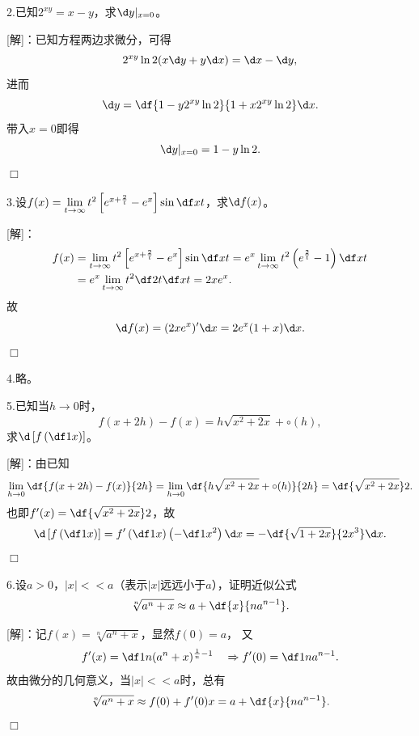 \bigskip

2.已知$2^{xy}=x-y$，求$\d y|_{x=0}$。

[解]：已知方程两边求微分，可得
$$2^{xy}\ln2(x\d y+y\d x)=\d x-\d y,$$
进而
$$\d y=\df{1-y2^{xy}\ln2}{1+x2^{xy}\ln2}\d x.$$
带入$x=0$即得
$$\d y|_{x=0}=1-y\ln2.$$
\hfill$\Box$

\bigskip

3.设$f(x)=\lim\limits_{t\to\infty}t^2
\left[e^{x+\frac2t}-e^x\right]\sin\df xt$，求$\d f(x)$。

[解]：
\begin{align*}
	f(x)&=\lim\limits_{t\to\infty}t^2
	\left[e^{x+\frac2t}-e^x\right]\sin\df xt
	=e^x\lim\limits_{t\to\infty}t^2
	\left(e^{\frac2t}-1\right)\df xt\\
	&=e^x\lim\limits_{t\to\infty}t^2\df2t\df xt
	=2xe^x.
\end{align*}
故
$$\d f(x)=(2xe^x)'\d x=2e^x(1+x)\d x.$$
\hfill$\Box$

\bigskip

4.略。

5.已知当$h\to 0$时，
$$f(x+2h)-f(x)=h\sqrt{x^2+2x}+\circ(h),$$
求$\d\left[f\left(\df1x\right)\right]$。

[解]：由已知
$$\lim\limits_{h\to0}\df{f(x+2h)-f(x)}{2h}
=\lim\limits_{h\to0}\df{h\sqrt{x^2+2x}+\circ(h)}{2h}
=\df{\sqrt{x^2+2x}}2.
$$
也即$f'(x)=\df{\sqrt{x^2+2x}}2$，故
$$\d\left[f\left(\df1x\right)\right]
=f'\left(\df1x\right)\left(-\df1{x^2}\right)\d x
=-\df{\sqrt{1+2x}}{2x^3}\d x.$$
\hfill$\Box$

\bigskip

6.设$a>0$，$|x|<<a$（表示$|x|$远远小于$a$），证明近似公式
$$\sqrt[n]{a^n+x}\approx a+\df{x}{na^{n-1}}.$$

[解]：记$f(x)=\sqrt[n]{a^n+x}$，显然$f(0)=a$，
又
$$f'(x)=\df1n(a^n+x)^{\frac1n-1}\quad
\Rightarrow f'(0)=\df1{na^{n-1}}.
$$
故由微分的几何意义，当$|x|<<a$时，总有
$$\sqrt[n]{a^n+x}\approx f(0)+f'(0)x
=a+\df{x}{na^{n-1}}.$$
\hfill$\Box$